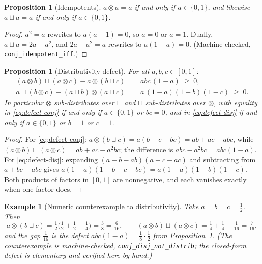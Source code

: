 \documentclass[11pt,a4paper]{article}
\newtheorem{proposition}[theorem]{Proposition}
\newtheorem{example}[theorem]{Example}
\newcommand{\conjc}{\otimes}
\newcommand{\disjc}{\sqcup}
\begin{document}
\begin{proposition}[Idempotents]
\label{prop:idempotent}
$a \conjc a = a$ if and only if $a \in \{0,1\}$, and likewise
$a \disjc a = a$ if and only if $a \in \{0,1\}$.
\end{proposition}

\begin{proof}
$a^2 = a$ rewrites to $a(a-1) = 0$, so $a = 0$ or $a = 1$.
Dually, $a \disjc a = 2a - a^2$, and $2a - a^2 = a$ rewrites to
$a(1-a) = 0$.
(Machine-checked, \texttt{conj\_idempotent\_iff}.)
\end{proof}

\begin{proposition}[Distributivity defect]
\label{prop:defect}
For all $a, b, c \in [0,1]$:
\begin{align}
(a \conjc b) \disjc (a \conjc c) - a \conjc (b \disjc c)
  &= abc\,(1-a) \;\geq\; 0,
\label{eq:defect-conj}\\
a \disjc (b \conjc c) - (a \disjc b) \conjc (a \disjc c)
  &= a\,(1-a)(1-b)(1-c) \;\geq\; 0.
\label{eq:defect-disj}
\end{align}
In particular $\conjc$ sub-distributes over $\disjc$ and $\disjc$
sub-distributes over $\conjc$, with equality in
\eqref{eq:defect-conj} if and only if $a \in \{0,1\}$ or $bc = 0$,
and in \eqref{eq:defect-disj} if and only if $a \in \{0,1\}$ or
$b = 1$ or $c = 1$.
\end{proposition}

\begin{proof}
For \eqref{eq:defect-conj}:
$a \conjc (b \disjc c) = a(b + c - bc) = ab + ac - abc$, while
$(a \conjc b) \disjc (a \conjc c) = ab + ac - a^2bc$;
the difference is $abc - a^2bc = abc(1-a)$.
For \eqref{eq:defect-disj}:
expanding $(a + b - ab)(a + c - ac)$ and subtracting from
$a + bc - abc$ gives
$a(1-a)(1 - b - c + bc) = a(1-a)(1-b)(1-c)$.
Both products of factors in $[0,1]$ are nonnegative, and each
vanishes exactly when one factor does.
\end{proof}

\begin{example}[Numeric counterexample to distributivity]
\label{ex:nondistrib}
Take $a = b = c = \tfrac{1}{2}$.
Then
\[
a \conjc (b \disjc c)
  = \tfrac{1}{2}\bigl(\tfrac{1}{2} + \tfrac{1}{2} - \tfrac{1}{4}\bigr)
  = \tfrac{3}{8}
  = \tfrac{6}{16},
\qquad
(a \conjc b) \disjc (a \conjc c)
  = \tfrac{1}{4} + \tfrac{1}{4} - \tfrac{1}{16}
  = \tfrac{7}{16},
\]
and the gap $\tfrac{1}{16}$ is the defect
$abc(1-a) = \tfrac{1}{8} \cdot \tfrac{1}{2}$ from
Proposition~\ref{prop:defect}.
(The counterexample is machine-checked,
\texttt{conj\_disj\_not\_distrib}; the closed-form defect is
elementary and verified here by hand.)
\end{example}
\end{document}
